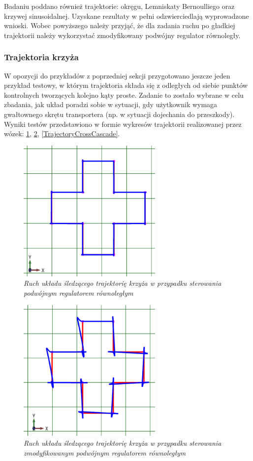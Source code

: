 \documentclass[12pt, oneside]{report}
\theoremstyle{definition}
\begin{document}
Badaniu poddano również trajektorie: okręgu, Lemniskaty Bernoulliego oraz krzywej sinusoidalnej. Uzyskane rezultaty w pełni odzwierciedlają wyprowadzone wnioski. Wobec powyższego należy przyjąć, że dla zadania ruchu po gładkiej trajektorii należy wykorzystać zmodyfikowany podwójny regulator równoległy.

\subsubsection{Trajektoria krzyża}
W opozycji do przykładów z poprzedniej sekcji przygotowano jeszcze jeden przykład testowy, w którym trajektoria składa się z odległych od siebie punktów kontrolnych tworzących kolejno kąty proste. Zadanie to zostało wybrane w celu zbadania, jak układ poradzi sobie w sytuacji, gdy użytkownik wymaga gwałtownego skrętu transportera (np. w sytuacji dojechania do przeszkody). Wyniki testów przedstawiono w formie wykresów trajektorii realizowanej przez wózek: \ref{TrajectoryCrossParallel}, \ref{TrajectoryCrossPD}, \ref{TrajectoryCrossCascade}.

\begin{figure}[H]
	\centering
		\includegraphics[width = 200pt]{TrajectoryCrossParallel} 
		\caption{\textit{Ruch układu śledzącego trajektorię krzyża w przypadku sterowania podwójnym regulatorem równoległym}}
		\label{TrajectoryCrossParallel}
\end{figure}

\begin{figure}[H]
	\centering
		\includegraphics[width = 200pt]{TrajectoryCrossPD} 
		\caption{\textit{Ruch układu śledzącego trajektorię krzyża w przypadku sterowania zmodyfikowanym podwójnym regulatorem równoległym}}
		\label{TrajectoryCrossPD}
\end{figure}
\end{document}
